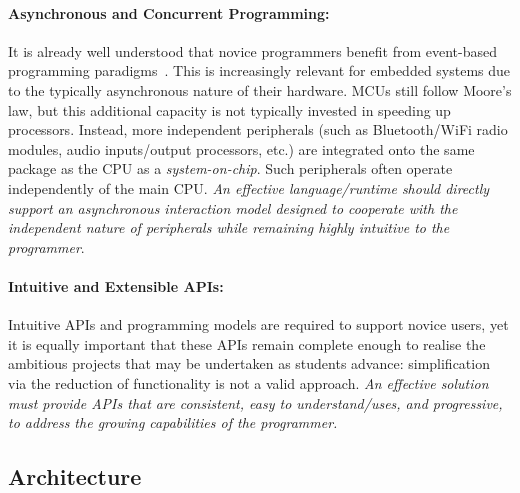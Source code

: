 \paragraph{Asynchronous and Concurrent Programming:}
It is already well understood that novice programmers benefit from event-based programming paradigms~\cite{maloney2008programming,maloney2010scratch,turbak2014events}. This is increasingly relevant for embedded systems due to the typically asynchronous nature of their hardware. MCUs still follow Moore's law,
but this additional capacity is not typically invested in speeding
up processors. Instead, more independent peripherals (such as Bluetooth/WiFi radio modules, audio inputs/output processors, etc.) are integrated onto the same package as the CPU as a \emph{system-on-chip}. Such peripherals often operate independently of the main CPU. \emph{An effective language/runtime should directly support an asynchronous interaction model designed to cooperate with the independent nature of peripherals while remaining highly intuitive to the programmer}.

\paragraph{Intuitive and Extensible APIs:}
Intuitive APIs and programming models are required to support novice users, yet it is equally important that these APIs remain complete enough to realise the ambitious projects that may be undertaken as students advance: simplification via the reduction of functionality is not a valid approach.
\emph{An effective solution must provide APIs that are consistent, easy to understand/uses, and progressive, to address the growing capabilities of the programmer.}

\subsection{Architecture}

